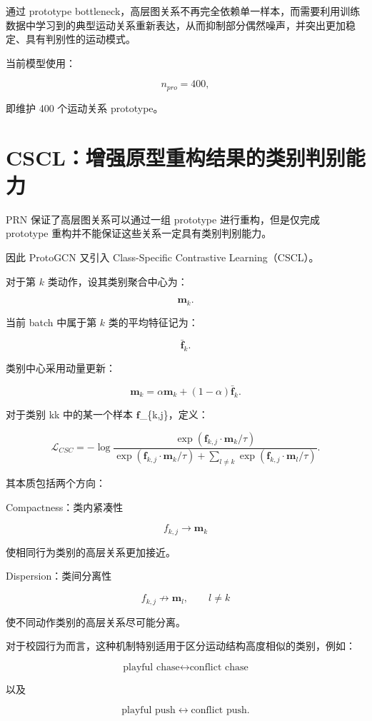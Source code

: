 通过 prototype bottleneck，高层图关系不再完全依赖单一样本，而需要利用训练数据中学习到的典型运动关系重新表达，从而抑制部分偶然噪声，并突出更加稳定、具有判别性的运动模式。

当前模型使用：

\[
n_{pro}=400,
\]

即维护 400 个运动关系 prototype。


\section{CSCL：增强原型重构结果的类别判别能力}

PRN 保证了高层图关系可以通过一组 prototype 进行重构，但是仅完成 prototype 重构并不能保证这些关系一定具有类别判别能力。

因此 ProtoGCN 又引入 Class-Specific Contrastive Learning（CSCL）。

对于第 \(k\) 类动作，设其类别聚合中心为：

\[
\mathbf m_k.
\]

当前 batch 中属于第 \(k\) 类的平均特征记为：

\[
\bar{\mathbf f}_k.
\]

类别中心采用动量更新：

\[
\mathbf m_k
=
\alpha\mathbf m_k
+
(1-\alpha)
\bar{\mathbf f}_k.
\]

对于类别 kk 中的某一个样本 \(\mathbf f\)\_\{k,j\}，定义：

\[
\mathcal L_{CSC}
=
-\log
\frac{
\exp(
\mathbf f_{k,j}
\cdot
\mathbf m_k/\tau
)
}{
\exp(
\mathbf f_{k,j}
\cdot
\mathbf m_k/\tau
)
+
\sum_{l\neq k}
\exp(
\mathbf f_{k,j}
\cdot
\mathbf m_l/\tau
)
}.
\]

其本质包括两个方向：

Compactness：类内紧凑性

\[
f_{k,j}
\rightarrow
\mathbf m_k
\]

使相同行为类别的高层关系更加接近。

Dispersion：类间分离性

\[
f_{k,j}
\not\rightarrow
\mathbf m_l,\qquad l\neq k
\]

使不同动作类别的高层关系尽可能分离。

对于校园行为而言，这种机制特别适用于区分运动结构高度相似的类别，例如：

\[
\text{playful chase}
\leftrightarrow
\text{conflict chase}
\]

以及

\[
\text{playful push}
\leftrightarrow
\text{conflict push}.
\]

